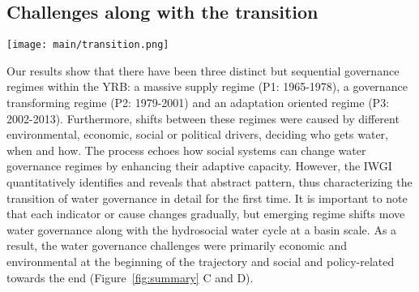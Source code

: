 \subsection{Challenges along with the transition}

\begin{figure*}[htbp!]
	\centering
	\texttt{[image: main/transition.png]}
	\caption{
		Transition schema in hydrosocial cycle and water governance regimes. The natural water cycle dominates blue pathways, while socio-economic feedback dominates red pathways.
		\textbf{A. Early phase.} As socio-economic systems develop, non-provisioning water demand increases; simultaneously, increased adaptive capacity by engineering allows people to manage water resources to alleviate the water stress.
		\textbf{B. Late phase} With further human interventions, trade-offs between provisioning-purpose and non-provisioning water use become prominent; a basin-wide socio-economic system requires more organized water governance.
		Thus, \textbf{C. the hydrosocial water cycle transition} correlates with the water governance regime shifts (in the YRB, they are massive supply regime, transformation governance regime, and adaptation oriented regime). The transformation governance regime shift occurs following the water deficit, with the rapid growth of adaptive capacity.
		\textbf{D. Water governance challenges} Through the transitional regimes, water governance faces primarily economic and environmental challenges in the early phase and social and policy challenges in the late phase.
	}
	\label{fig:summary}
\end{figure*}

Our results show that there have been three distinct but sequential governance regimes within the YRB: a massive supply regime (P1: 1965-1978), a governance transforming regime (P2: 1979-2001) and an adaptation oriented regime (P3: 2002-2013).
Furthermore, shifts between these regimes were caused by different environmental, economic, social or political drivers, deciding who gets water, when and how.
The process echoes how social systems can change water governance regimes by enhancing their adaptive capacity. %
However, the IWGI quantitatively identifies and reveals that abstract pattern, thus characterizing the transition of water governance in detail for the first time.
It is important to note that each indicator or cause changes gradually, but emerging regime shifts move water governance along with the hydrosocial water cycle at a basin scale.
As a result, the water governance challenges were primarily economic and environmental at the beginning of the trajectory and social and policy-related towards the end (Figure~\ref{fig:summary} C and D).

